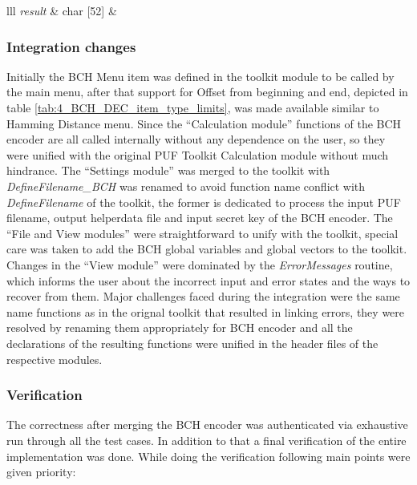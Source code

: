 \begin{table}[!ht]
\begin{center}
\begin{tabular}{lll}
\emph{result} & char [52] & \\
\hline
\addlinespace
\bottomrule
\end{tabular}
\end{center}
\caption{Names and types of each element in the data structure \emph{Item} for the \emph{PUF BCH Encoder} and a description regarding their purpose.}
\label{tab:4_BCH_item_type_limits}
\end{table}

\subsubsection{Integration changes}
Initially the BCH Menu item was defined in the toolkit module to be called by the main menu, after that support for Offset from beginning and end, depicted in table \ref{tab:4_BCH_DEC_item_type_limits}, was made available similar to Hamming Distance menu. Since the ``Calculation module'' functions of the BCH encoder are all called internally without any dependence on the user, so they were unified with the original PUF Toolkit Calculation module without much hindrance.
The ``Settings module'' was merged to the toolkit with \emph{DefineFilename\_BCH} was renamed to avoid function name conflict with \emph{DefineFilename} of the toolkit, the former is dedicated to process the input PUF filename, output helperdata file and input secret key of the BCH encoder. The ``File and View modules'' were straightforward to unify with the toolkit, special care was taken to add the BCH global variables and global vectors to the toolkit. Changes in the ``View
module'' were dominated by the \emph{ErrorMessages} routine, which informs the user about the incorrect input and error states and the ways to recover from them. Major challenges faced during the integration were the same name functions as in the orignal toolkit that resulted in linking errors, they were resolved by renaming them appropriately for BCH encoder and all the declarations of the resulting functions were unified in the header files of the respective modules.\\

\subsubsection{Verification}
The correctness after merging the BCH encoder was authenticated via exhaustive run through all the test cases. In addition to that a final verification of the entire implementation was done. While doing the verification following main points were given priority:

